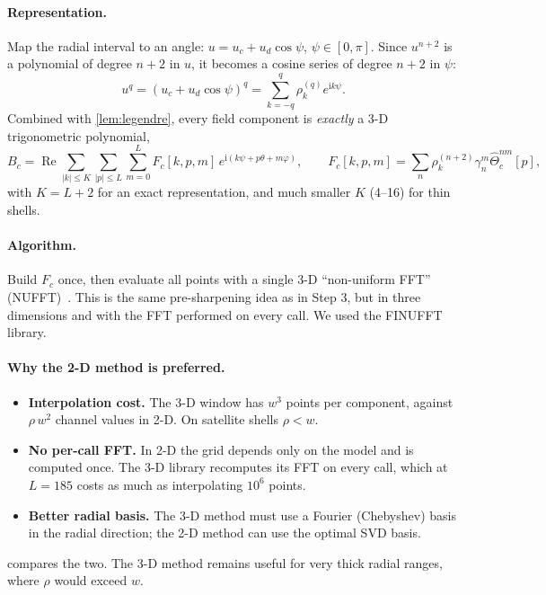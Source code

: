 \documentclass[11pt,a4paper]{article}
\theoremstyle{definition}
\renewcommand{\Re}{\operatorname{Re}}
\newcommand{\ii}{\mathrm{i}}
\begin{document}
\paragraph{Representation.} Map the radial interval to an angle: $u=u_c+u_d\cos\psi$, $\psi\in[0,\pi]$. Since $u^{n+2}$ is a polynomial of degree
$n+2$ in $u$, it becomes a cosine series of degree $n+2$ in $\psi$:
\[
u^{q}=(u_c+u_d\cos\psi)^q=\sum_{k=-q}^{q}\rho_k^{(q)}e^{\ii k\psi}.
\]
Combined with \cref{lem:legendre}, every field component is \emph{exactly} a 3-D trigonometric polynomial,
\[
B_c=\Re\sum_{|k|\le K}\sum_{|p|\le L}\sum_{m=0}^{L}F_c[k,p,m]\,e^{\ii(k\psi+p\theta+m\varphi)},\qquad
F_c[k,p,m]=\sum_n\rho_k^{(n+2)}\gamma_n^m\widehat\Theta_c^{nm}[p],
\]
with $K=L+2$ for an exact representation, and much smaller $K$ (4--16) for thin shells.

\paragraph{Algorithm.} Build $F_c$ once, then evaluate all points with a single 3-D ``non-uniform FFT''
(NUFFT)~\cite{dutt1993,greengard2004,barnett2019}. This is the same pre-sharpening idea as in Step 3, but in three dimensions and with
the FFT performed on every call. We used the FINUFFT library.

\paragraph{Why the 2-D method is preferred.}
\begin{itemize}
\item \textbf{Interpolation cost.} The 3-D window has $w^3$ points per component, against $\rho\,w^2$ channel values in 2-D. On satellite shells $\rho<w$.
\item \textbf{No per-call FFT.} In 2-D the grid depends only on the model and is computed once. The 3-D library recomputes its FFT on every call,
  which at $L=185$ costs as much as interpolating $10^6$ points.
\item \textbf{Better radial basis.} The 3-D method must use a Fourier (Chebyshev) basis in the radial direction; the 2-D method can use the optimal SVD basis.
\end{itemize}
 compares the two. The 3-D method remains useful for very thick radial ranges, where $\rho$ would exceed $w$.



\end{document}

